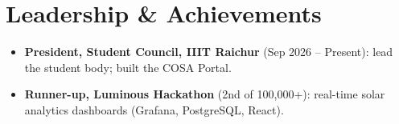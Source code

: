 \documentclass[letterpaper,10pt]{article}
\newenvironment{points}{\begin{itemize}[leftmargin=12pt,itemsep=0.5pt,topsep=2pt,parsep=0pt,label={\small\textbullet}]\small}{\end{itemize}\vspace{2pt}}
\begin{document}
\section{Leadership \& Achievements}
\begin{points}
  \item \textbf{President, Student Council, IIIT Raichur} (Sep 2026 -- Present): lead the student body; built the COSA Portal.
  \item \textbf{Runner-up, Luminous Hackathon} (2nd of 100,000+): real-time solar analytics dashboards (Grafana, PostgreSQL, React).
\end{points}
\end{document}
